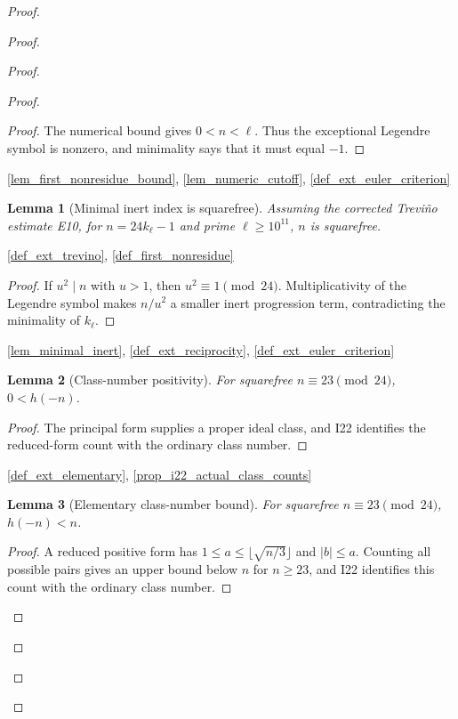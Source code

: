 \documentclass[11pt,a4paper]{article}
\numberwithin{equation}{section}
\theoremstyle{plain}\newtheorem{theorem}{Theorem}[section]\newaliascnt{proposition}{theorem}\newtheorem{proposition}[proposition]{Proposition}\aliascntresetthe{proposition}\newaliascnt{lemma}{theorem}\newtheorem{lemma}[lemma]{Lemma}\aliascntresetthe{lemma}
\theoremstyle{definition}\newaliascnt{definition}{theorem}\newtheorem{definition}[definition]{Definition}\aliascntresetthe{definition}\newaliascnt{notation}{theorem}\newtheorem{notation}[notation]{Notation}\aliascntresetthe{notation}
\providecommand{\lean}[1]{}\providecommand{\leanok}{}
\begin{document}
\begin{proof}
\begin{proof}
\begin{proof}
\begin{proof}
\begin{proof}
The numerical bound gives $0<n<\ell$.  Thus the exceptional Legendre symbol is nonzero, and minimality says that it must equal $-1$.
\end{proof}
\begin{uses-proof}\ref{lem_first_nonresidue_bound}, \ref{lem_numeric_cutoff}, \ref{def_ext_euler_criterion}\end{uses-proof}
\begin{lemma}[Minimal inert index is squarefree]\label{lem_minimal_squarefree}\lean{SptCM.Repair.minimalExceptionalIndex_squarefree}\leanok
Assuming the corrected Treviño estimate E10, for
$n=24k_\ell-1$ and prime $\ell\ge10^{11}$, $n$ is squarefree.
\end{lemma}
\begin{uses-statement}\ref{def_ext_trevino}, \ref{def_first_nonresidue}\end{uses-statement}
\begin{proof}
If $u^2\mid n$ with $u>1$, then $u^2\equiv1\pmod{24}$.  Multiplicativity of the Legendre symbol makes $n/u^2$ a smaller inert progression term, contradicting the minimality of $k_\ell$.
\end{proof}
\begin{uses-proof}\ref{lem_minimal_inert}, \ref{def_ext_reciprocity}, \ref{def_ext_euler_criterion}\end{uses-proof}
\begin{lemma}[Class-number positivity]\label{lem_class_number_pos}\lean{SptCM.negativeClassNumber_pos}\leanok
For squarefree $n\equiv23\pmod{24}$, $0<h(-n)$.
\end{lemma}
\begin{proof}
The principal form supplies a proper ideal class, and I22 identifies the reduced-form count with the ordinary class number.
\end{proof}
\begin{uses-proof}\ref{def_ext_elementary}, \ref{prop_i22_actual_class_counts}\end{uses-proof}
\begin{lemma}[Elementary class-number bound]\label{lem_class_number_bound}\lean{SptCM.class_number_bound}\leanok
For squarefree $n\equiv23\pmod{24}$, $h(-n)<n$.
\end{lemma}
\begin{proof}
A reduced positive form has $1\le a\le\lfloor\sqrt{n/3}\rfloor$ and $|b|\le a$.  Counting all possible pairs gives an upper bound below $n$ for $n\ge23$, and I22 identifies this count with the ordinary class number.

\end{proof}
\end{proof}
\end{proof}
\end{proof}
\end{proof}
\end{document}
